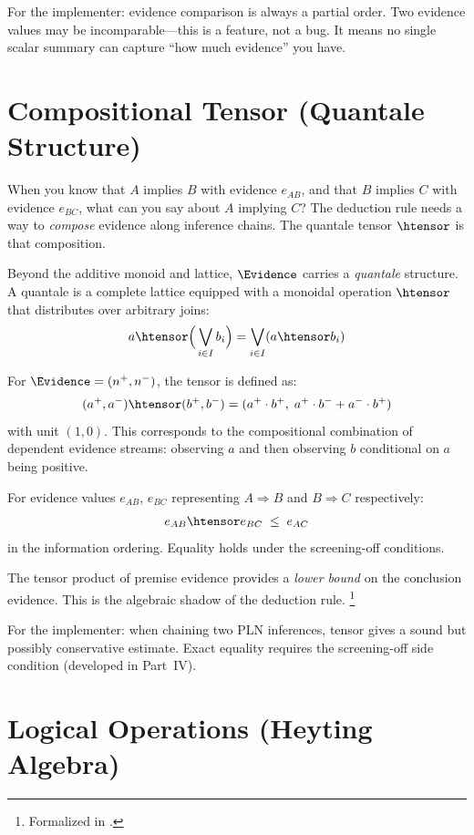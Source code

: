 \documentclass[11pt,openany]{report}
\begin{document}
For the implementer: evidence comparison is always a partial order.  Two
evidence values may be incomparable---this is a feature, not a bug.  It
means no single scalar summary can capture ``how much evidence'' you have.

\section{Compositional Tensor (Quantale Structure)}

When you know that $A$ implies $B$ with evidence $e_{AB}$, and that $B$
implies $C$ with evidence $e_{BC}$, what can you say about $A$ implying
$C$?  The deduction rule needs a way to \emph{compose} evidence along
inference chains.  The quantale tensor $\htensor$ is that composition.

Beyond the additive monoid and lattice, $\Evidence$ carries a
\emph{quantale} structure.  A quantale is a complete lattice equipped
with a monoidal operation $\htensor$ that distributes over arbitrary
joins:
\[
  a \htensor \Big(\bigvee_{i \in I} b_i\Big) = \bigvee_{i \in I} (a \htensor b_i)
\]

For $\Evidence = (n^+, n^-)$, the tensor is defined as:
\[
  (a^+, a^-) \htensor (b^+, b^-) = (a^+ \cdot b^+,\; a^+ \cdot b^- + a^- \cdot b^+)
\]
with unit $(1, 0)$.  This corresponds to the compositional combination of
dependent evidence streams: observing $a$ and then observing $b$ conditional
on $a$ being positive.

\begin{theorem}
\label{thm:quantale-trans}
For evidence values $e_{AB}$, $e_{BC}$ representing
$A \Rightarrow B$ and $B \Rightarrow C$ respectively:
\[
  e_{AB} \htensor e_{BC} \;\le\; e_{AC}
\]
in the information ordering.  Equality holds under the screening-off
conditions.
\end{theorem}

\noindent
The tensor product of premise evidence provides a \emph{lower bound} on the
conclusion evidence.  This is the algebraic shadow of the deduction rule.%
\footnote{Formalized in .}

For the implementer: when chaining two PLN inferences, tensor gives a
sound but possibly conservative estimate.  Exact equality requires the
screening-off side condition (developed in Part~IV).

\section{Logical Operations (Heyting Algebra)}
\end{document}
